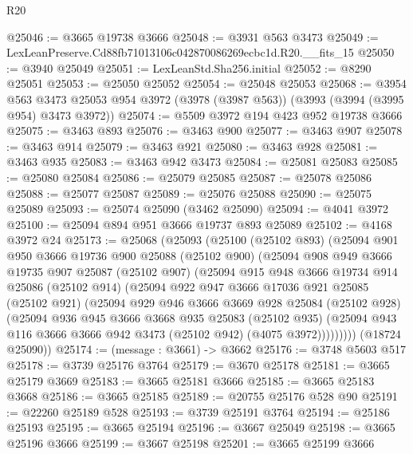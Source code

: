 \begin{lexlean}{R20}
\begin{coremodule}
@25046 := @3665 @19738 @3666
@25048 := @3931 @563 @3473
@25049 := LexLeanPreserve.Cd88fb71013106c042870086269ecbc1d.R20.__fits_15
@25050 := @3940 @25049
@25051 := LexLeanStd.Sha256.initial
@25052 := @8290 @25051
@25053 := @25050 @25052
@25054 := @25048 @25053
@25068 := @3954
    @563
    @3473
    @25053
    @954
    @3972
    (@3978 (@3987 @563))
    (@3993 (@3994 (@3995 @954) @3473 @3972))
@25074 := @5509 @3972 @194 @423 @952 @19738 @3666
@25075 := @3463 @893
@25076 := @3463 @900
@25077 := @3463 @907
@25078 := @3463 @914
@25079 := @3463 @921
@25080 := @3463 @928
@25081 := @3463 @935
@25083 := @3463 @942 @3473
@25084 := @25081 @25083
@25085 := @25080 @25084
@25086 := @25079 @25085
@25087 := @25078 @25086
@25088 := @25077 @25087
@25089 := @25076 @25088
@25090 := @25075 @25089
@25093 := @25074 @25090 (@3462 @25090)
@25094 := @4041 @3972
@25100 := @25094 @894 @951 @3666 @19737 @893 @25089
@25102 := @4168 @3972 @24
@25173 := @25068
    (@25093
      (@25100
        (@25102 @893)
        (@25094
          @901
          @950
          @3666
          @19736
          @900
          @25088
          (@25102 @900)
          (@25094
            @908
            @949
            @3666
            @19735
            @907
            @25087
            (@25102 @907)
            (@25094
              @915
              @948
              @3666
              @19734
              @914
              @25086
              (@25102 @914)
              (@25094
                @922
                @947
                @3666
                @17036
                @921
                @25085
                (@25102 @921)
                (@25094
                  @929
                  @946
                  @3666
                  @3669
                  @928
                  @25084
                  (@25102 @928)
                  (@25094
                    @936
                    @945
                    @3666
                    @3668
                    @935
                    @25083
                    (@25102 @935)
                    (@25094 @943 @116 @3666 @3666 @942 @3473 (@25102 @942) (@4075 @3972)))))))))
      (@18724 @25090))
@25174 := (message : @3661) -> @3662
@25176 := @3748 @5603 @517
@25178 := @3739 @25176 @3764
@25179 := @3670 @25178
@25181 := @3665 @25179 @3669
@25183 := @3665 @25181 @3666
@25185 := @3665 @25183 @3668
@25186 := @3665 @25185
@25189 := @20755 @25176 @528 @90
@25191 := @22260 @25189 @528
@25193 := @3739 @25191 @3764
@25194 := @25186 @25193
@25195 := @3665 @25194
@25196 := @3667 @25049
@25198 := @3665 @25196 @3666
@25199 := @3667 @25198
@25201 := @3665 @25199 @3666

\end{coremodule}
\end{lexlean}
